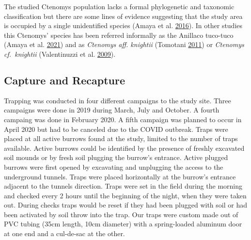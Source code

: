 \documentclass[msc,numbers,hidelinks]{coppe}
\begin{document}
  The studied Ctenomys population lacks a formal phylogenetic and taxonomic classification but there are some lines of evidence suggesting that the study area is occupied by a single unidentified species (Amaya et al. \protect\hyperlink{ref-amayaFormFunctionLongrange2016}{2016}). In other studies this Ctenomys' species has been referred informally as the Anillaco tuco-tuco (Amaya et al. \protect\hyperlink{ref-amayaDynamicSpatialOverlap2021}{2021}) and as \emph{Ctenomys aff. knightii} (Tomotani \protect\hyperlink{ref-tomotaniPosefeitosSincronizacaoEm2011}{2011}) or \emph{Ctenomys cf.~knightii} (Valentinuzzi et al. \protect\hyperlink{ref-valentinuzziCircadianPatternWheel2009}{2009}).

  \hypertarget{capture-and-recapture}{%
  \subsection{Capture and Recapture}\label{capture-and-recapture}}

  Trapping was conducted in four different campaigns to the study site. Three campaigns were done in 2019 during March, July and October. A fourth campaing was done in February 2020. A fifth campaign was planned to occur in April 2020 but had to be canceled due to the COVID outbreak. Traps were placed at all active burrows found at the study, limited to the number of traps available. Active burrows could be identified by the presence of freshly excavated soil mounds or by fresh soil plugging the burrow's entrance. Active plugged burrows were first opened by excavating and unplugging the access to the underground tunnels. Traps were placed horizontally at the burrow's entrance adjacent to the tunnels direction. Traps were set in the field during the morning and checked every 2 hours until the beginning of the night, when they were taken out. During checks traps would be reset if they had been plugged with soil or had been activated by soil throw into the trap. Our traps were custom made out of PVC tubing (35cm length, 10cm diameter) with a spring-loaded aluminum door at one end and a cul-de-sac at the other.
\end{document}
